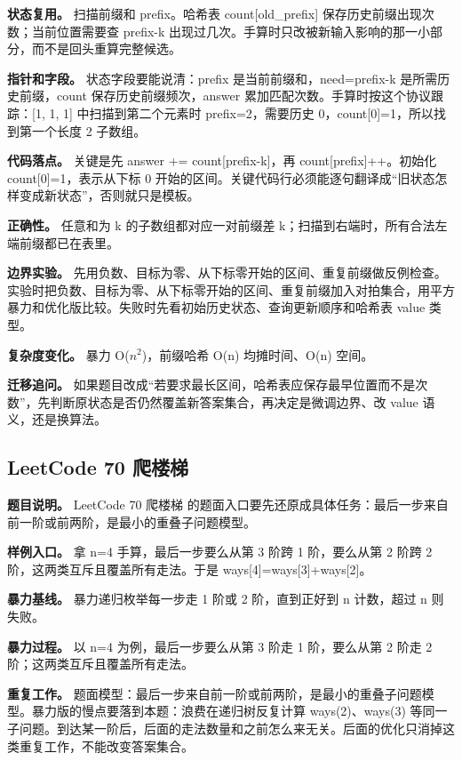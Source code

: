 \textbf{状态复用。} 扫描前缀和 prefix。哈希表 count[old\_prefix] 保存历史前缀出现次数；当前位置需要查 prefix-k 出现过几次。手算时只改被新输入影响的那一小部分，而不是回头重算完整候选。

\textbf{指针和字段。} 状态字段要能说清：prefix 是当前前缀和，need=prefix-k 是所需历史前缀，count 保存历史前缀频次，answer 累加匹配次数。手算时按这个协议跟踪：[1, 1, 1] 中扫描到第二个元素时 prefix=2，需要历史 0，count[0]=1，所以找到第一个长度 2 子数组。

\textbf{代码落点。} 关键是先 answer += count[prefix-k]，再 count[prefix]++。初始化 count[0]=1，表示从下标 0 开始的区间。关键代码行必须能逐句翻译成“旧状态怎样变成新状态”，否则就只是模板。

\textbf{正确性。} 任意和为 k 的子数组都对应一对前缀差 k；扫描到右端时，所有合法左端前缀都已在表里。

\textbf{边界实验。} 先用负数、目标为零、从下标零开始的区间、重复前缀做反例检查。实验时把负数、目标为零、从下标零开始的区间、重复前缀加入对拍集合，用平方暴力和优化版比较。失败时先看初始历史状态、查询更新顺序和哈希表 value 类型。

\textbf{复杂度变化。} 暴力 O(\ensuremath{n^{2}})，前缀哈希 O(n) 均摊时间、O(n) 空间。

\textbf{迁移追问。} 如果题目改成“若要求最长区间，哈希表应保存最早位置而不是次数”，先判断原状态是否仍然覆盖新答案集合，再决定是微调边界、改 value 语义，还是换算法。

\subsection{LeetCode 70 爬楼梯}

\textbf{题目说明。} LeetCode 70 爬楼梯 的题面入口要先还原成具体任务：最后一步来自前一阶或前两阶，是最小的重叠子问题模型。

\textbf{样例入口。} 拿 n=4 手算，最后一步要么从第 3 阶跨 1 阶，要么从第 2 阶跨 2 阶，这两类互斥且覆盖所有走法。于是 ways[4]=ways[3]+ways[2]。

\textbf{暴力基线。} 暴力递归枚举每一步走 1 阶或 2 阶，直到正好到 n 计数，超过 n 则失败。

\textbf{暴力过程。} 以 n=4 为例，最后一步要么从第 3 阶走 1 阶，要么从第 2 阶走 2 阶；这两类互斥且覆盖所有走法。

\textbf{重复工作。} 题面模型：最后一步来自前一阶或前两阶，是最小的重叠子问题模型。暴力版的慢点要落到本题：浪费在递归树反复计算 ways(2)、ways(3) 等同一子问题。到达某一阶后，后面的走法数量和之前怎么来无关。后面的优化只消掉这类重复工作，不能改变答案集合。

